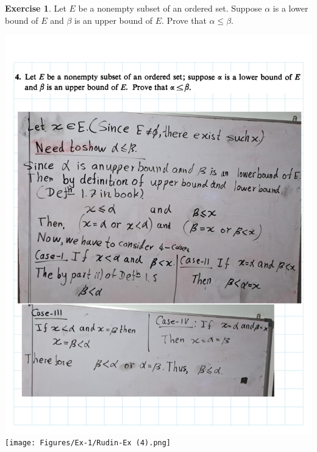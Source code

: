 \documentclass[
]{book}
\theoremstyle{definition}
\theoremstyle{definition}
\theoremstyle{definition}
\newtheorem{exercise}{Exercise}[chapter]
\theoremstyle{definition}
\theoremstyle{remark}
\begin{document}
\begin{exercise}
\protect\hypertarget{exr:unnamed-chunk-5}{}\label{exr:unnamed-chunk-5}Let \(E\) be a nonempty subset of an ordered set. Suppose \(\alpha\) is a lower bound of \(E\) and \(\beta\) is an upper bound of \(E\). Prove that \(\alpha \leq \beta\).
\end{exercise}

\includegraphics{Figures/Ex-1/Rudin-Ex (3).png}
\texttt{[image: Figures/Ex-1/Rudin-Ex (4).png]}
\end{document}
